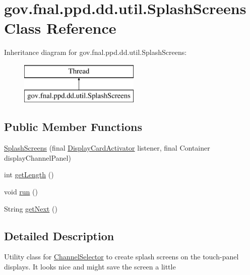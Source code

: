 \hypertarget{classgov_1_1fnal_1_1ppd_1_1dd_1_1util_1_1SplashScreens}{\section{gov.\-fnal.\-ppd.\-dd.\-util.\-Splash\-Screens Class Reference}
\label{classgov_1_1fnal_1_1ppd_1_1dd_1_1util_1_1SplashScreens}
}
Inheritance diagram for gov.\-fnal.\-ppd.\-dd.\-util.\-Splash\-Screens\-:\begin{figure}[H]
\begin{center}
\leavevmode
\includegraphics[height=2.000000cm]{classgov_1_1fnal_1_1ppd_1_1dd_1_1util_1_1SplashScreens}
\end{center}
\end{figure}
\subsection*{Public Member Functions}
\begin{DoxyCompactItemize}
\item 
\hyperlink{classgov_1_1fnal_1_1ppd_1_1dd_1_1util_1_1SplashScreens_a3951a9bd85370e3f2dd19c1607c5f465}{Splash\-Screens} (final \hyperlink{interfacegov_1_1fnal_1_1ppd_1_1dd_1_1util_1_1DisplayCardActivator}{Display\-Card\-Activator} listener, final Container display\-Channel\-Panel)
\item 
int \hyperlink{classgov_1_1fnal_1_1ppd_1_1dd_1_1util_1_1SplashScreens_adb81aa078a65f2a043f96d8db686bd5c}{get\-Length} ()
\item 
void \hyperlink{classgov_1_1fnal_1_1ppd_1_1dd_1_1util_1_1SplashScreens_a334862829af49ec6ccbcb9502195c6b3}{run} ()
\item 
String \hyperlink{classgov_1_1fnal_1_1ppd_1_1dd_1_1util_1_1SplashScreens_a7e222fd082c2535e819365fb90bdb603}{get\-Next} ()
\end{DoxyCompactItemize}


\subsection{Detailed Description}
Utility class for \hyperlink{classgov_1_1fnal_1_1ppd_1_1dd_1_1ChannelSelector}{Channel\-Selector} to create splash screens on the touch-\/panel displays. It looks nice and might save the screen a little

